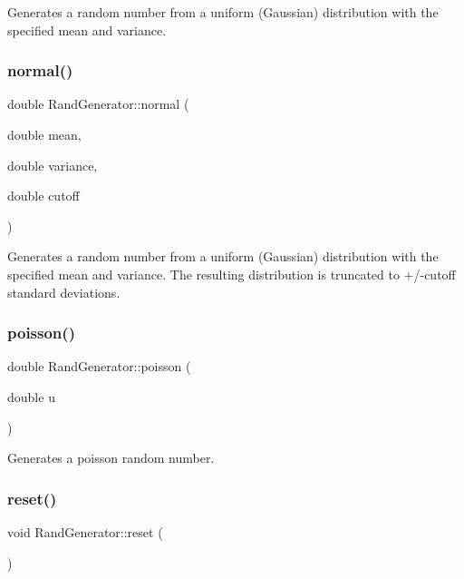 Generates a random number from a uniform (Gaussian) distribution with the specified mean and variance. \mbox{\label{classRandGenerator_a0cc4c8abf0dd7d376a6574ec25617a41}} 
\subsubsection{\texorpdfstring{normal()}{normal()}\hspace{0.1cm}{\footnotesize\ttfamily [2/2]}}
{\footnotesize\ttfamily double Rand\+Generator\+::normal (\begin{DoxyParamCaption}\item[{double}]{mean,  }\item[{double}]{variance,  }\item[{double}]{cutoff }\end{DoxyParamCaption})}

Generates a random number from a uniform (Gaussian) distribution with the specified mean and variance. The resulting distribution is truncated to +/-\/cutoff standard deviations. \mbox{\label{classRandGenerator_a73dbeaf8bc87bb14c4a5be15c554f08f}} 
\subsubsection{\texorpdfstring{poisson()}{poisson()}}
{\footnotesize\ttfamily double Rand\+Generator\+::poisson (\begin{DoxyParamCaption}\item[{double}]{u }\end{DoxyParamCaption})}

Generates a poisson random number. \mbox{\label{classRandGenerator_a7f8d9a54d46bc0bf9ab5b3bf5e369396}} 
\subsubsection{\texorpdfstring{reset()}{reset()}\hspace{0.1cm}{\footnotesize\ttfamily [1/2]}}
{\footnotesize\ttfamily void Rand\+Generator\+::reset (\begin{DoxyParamCaption}{ }\end{DoxyParamCaption})}

